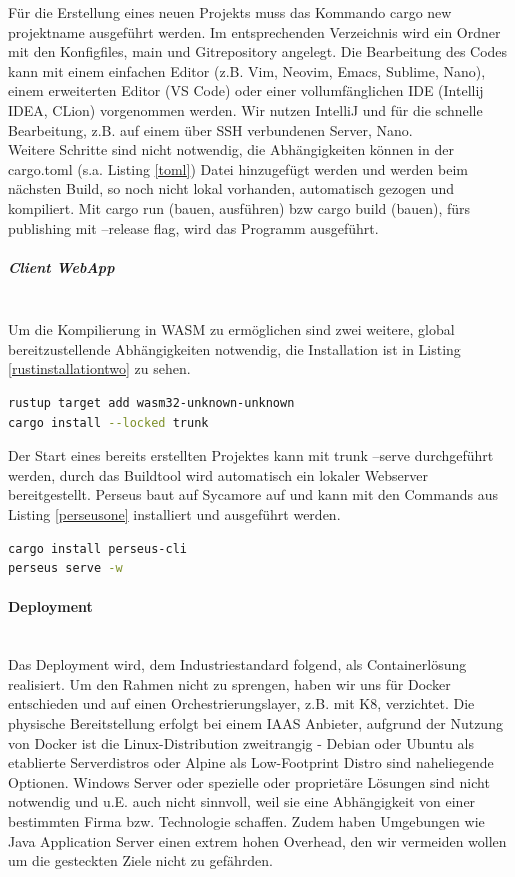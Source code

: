 \documentclass[notitlepage, hidelinks]{article}
\begin{document}
Für die Erstellung eines neuen Projekts muss das Kommando cargo new projektname ausgeführt werden. Im entsprechenden Verzeichnis wird ein Ordner mit den Konfigfiles, main und Gitrepository angelegt. Die Bearbeitung des Codes kann mit einem einfachen Editor (z.B. Vim, Neovim, Emacs, Sublime, Nano), einem erweiterten Editor (VS Code) oder einer vollumfänglichen IDE (Intellij IDEA, CLion) vorgenommen werden. Wir nutzen IntelliJ und für die schnelle Bearbeitung, z.B. auf einem über SSH verbundenen Server, Nano. \\
Weitere Schritte sind nicht notwendig, die Abhängigkeiten können in der cargo.toml (s.a. Listing \ref{toml}) Datei hinzugefügt werden und werden beim nächsten Build, so noch nicht lokal vorhanden, automatisch gezogen und kompiliert. Mit cargo run (bauen, ausführen) bzw cargo build (bauen), fürs publishing mit --release flag, wird das Programm ausgeführt. 

\subparagraph{Client WebApp} \mbox{} \\
Um die Kompilierung in WASM zu ermöglichen sind zwei weitere, global bereitzustellende Abhängigkeiten notwendig, die Installation ist in Listing \ref{rustinstallationtwo} zu sehen.

\begin{lstlisting}[language=bash,frame=single,caption=CLI Command zur Installation der Laufzeitumgebung webassembly und des WASM-Buildtools Trunk für Rust,label=rustinstallationtwo]
rustup target add wasm32-unknown-unknown
cargo install --locked trunk
\end{lstlisting}

Der Start eines bereits erstellten Projektes kann mit trunk --serve durchgeführt werden, durch das Buildtool wird automatisch ein lokaler Webserver bereitgestellt. Perseus baut auf Sycamore auf und kann mit den Commands aus Listing \ref{perseusone} installiert und ausgeführt werden.

\begin{lstlisting}[language=bash,frame=single,caption=CLI Command zur Installation der Perseus CLI und Ausführung eines Projektes,label=perseusone]
cargo install perseus-cli
perseus serve -w
\end{lstlisting}

\paragraph{Deployment} \mbox{} \\
Das Deployment wird, dem Industriestandard folgend, als Containerlösung realisiert. Um den Rahmen nicht zu sprengen, haben wir uns für Docker entschieden und auf einen Orchestrierungslayer, z.B. mit K8, verzichtet. Die physische Bereitstellung erfolgt bei einem IAAS Anbieter, aufgrund der Nutzung von Docker ist die Linux-Distribution zweitrangig - Debian oder Ubuntu als etablierte Serverdistros oder Alpine als Low-Footprint Distro sind naheliegende Optionen. Windows Server oder spezielle oder proprietäre Lösungen sind nicht notwendig und u.E. auch nicht sinnvoll, weil sie eine Abhängigkeit von einer bestimmten Firma bzw. Technologie schaffen. Zudem haben Umgebungen wie Java Application Server einen extrem hohen Overhead, den wir vermeiden wollen um die gesteckten Ziele nicht zu gefährden. 
\end{document}
